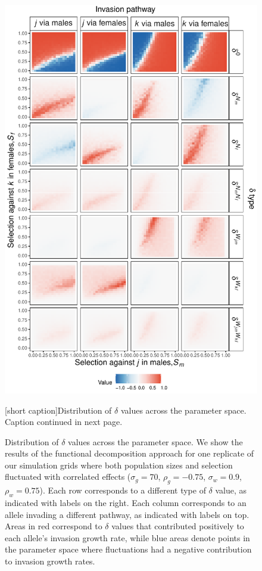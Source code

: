 \documentclass[12pt]{article}
\begin{document}

\begin{figure}[H]
  \centerline{\includegraphics[width=1\textwidth]{param_space.pdf}}
    \label{fig:space}
    [short caption]{Distribution of $\delta$ values across the parameter space. Caption continued in next page.}
\end{figure}

\addtocounter{figure}{-1}
\begin{figure} [H]
  \caption{ Distribution of $\delta$ values across the parameter space. We show the results of the functional decomposition approach for one replicate of our simulation grids where  both population sizes and selection fluctuated with correlated effects  ($\sigma_{g}=70$, $\rho_{g}=-0.75$, $\sigma_{w}=0.9$, $\rho_{w}=0.75$). Each row corresponds to a different type of $\delta$ value, as indicated with labels on the right. Each column corresponds to an allele invading a different pathway, as indicated with labels on top. Areas in red correspond to $\delta$ values that contributed positively to each allele's invasion growth rate, while blue areas denote points in the parameter space where fluctuations had a negative contribution to invasion growth rates.  }%
    \label{fig:space}
\end{figure}
\end{document}
